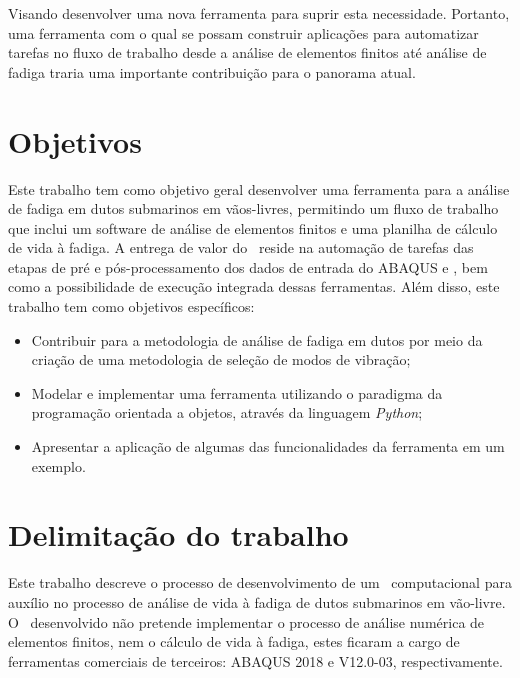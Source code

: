Visando desenvolver uma nova ferramenta para suprir esta necessidade. Portanto, uma ferramenta com o qual se possam construir aplicações para automatizar tarefas no fluxo de trabalho desde a análise de elementos finitos até análise de fadiga traria uma importante contribuição para o panorama atual.


\section{Objetivos}


Este trabalho tem como objetivo geral desenvolver uma ferramenta para a análise de fadiga em dutos submarinos em vãos-livres, permitindo um fluxo de trabalho que inclui um software de análise de elementos finitos e uma planilha de cálculo de vida à fadiga.
A entrega de valor do \frame\ reside na automação de tarefas das etapas de pré e pós-processamento dos dados de entrada do ABAQUS e \fatfree, bem como a possibilidade de execução integrada dessas ferramentas.
Além disso, este trabalho tem como objetivos específicos:

\begin{itemize}
    \item Contribuir para a metodologia de análise de fadiga em dutos por meio da criação de uma metodologia de seleção de modos de vibração;
    \item Modelar e implementar uma ferramenta utilizando o paradigma da programação orientada a objetos, através da linguagem \textit{Python};
    \item Apresentar a aplicação de algumas das funcionalidades da ferramenta em um exemplo.
\end{itemize}


\section{Delimitação do trabalho}


Este trabalho descreve o processo de desenvolvimento de um \frame\ computacional para auxílio no processo de análise de vida à fadiga de dutos submarinos em vão-livre. O \frame\ desenvolvido não pretende implementar o processo de análise numérica de elementos finitos, nem o cálculo de vida à fadiga, estes ficaram a cargo de ferramentas comerciais de terceiros: ABAQUS 2018 e \fatfree V12.0-03, respectivamente.



